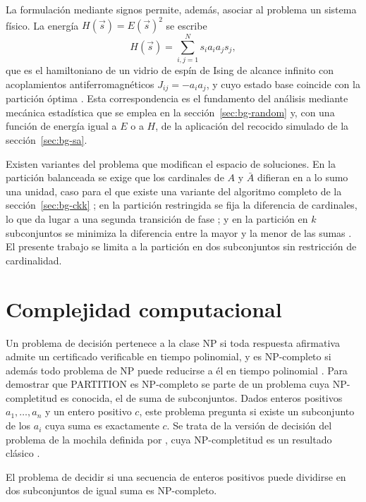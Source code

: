 La formulación mediante signos permite, además, asociar al problema un sistema físico. La energía $H(\vec{s}) = E(\vec{s})^2$ se escribe
\begin{equation}
    H(\vec{s}) = \sum_{i,j=1}^{N} s_i a_i a_j s_j,
    \label{eq:bg-hamiltonian}
\end{equation}
que es el hamiltoniano de un vidrio de espín de Ising de alcance infinito con acoplamientos antiferromagnéticos $J_{ij} = -a_i a_j$, y cuyo estado base coincide con la partición óptima \parencite{mertens1998,mertens2001,ferreira1998}. Esta correspondencia es el fundamento del análisis mediante mecánica estadística que se emplea en la sección~\ref{sec:bg-random} y, con una función de energía igual a $E$ o a $H$, de la aplicación del recocido simulado de la sección~\ref{sec:bg-sa}.

Existen variantes del problema que modifican el espacio de soluciones. En la partición balanceada se exige que los cardinales de $A$ y $\bar{A}$ difieran en a lo sumo una unidad, caso para el que existe una variante del algoritmo completo de la sección~\ref{sec:bg-ckk} \parencite{mertens1999}; en la partición restringida se fija la diferencia de cardinales, lo que da lugar a una segunda transición de fase \parencite{mertens2001}; y en la partición en $k$ subconjuntos se minimiza la diferencia entre la mayor y la menor de las sumas \parencite{korf1998,gent1996}. El presente trabajo se limita a la partición en dos subconjuntos sin restricción de cardinalidad.

\section{Complejidad computacional}

Un problema de decisión pertenece a la clase NP si toda respuesta afirmativa admite un certificado verificable en tiempo polinomial, y es NP-completo si además todo problema de NP puede reducirse a él en tiempo polinomial \parencite{cook1971,garey1979}. Para demostrar que PARTITION es NP-completo se parte de un problema cuya NP-completitud es conocida, el de suma de subconjuntos. Dados enteros positivos $a_1, \ldots, a_n$ y un entero positivo $c$, este problema pregunta si existe un subconjunto de los $a_i$ cuya suma es exactamente $c$. Se trata de la versión de decisión del problema de la mochila definida por \textcite{karp1972}, cuya NP-completitud es un resultado clásico \parencite{karp1972,garey1979,merkle1978}.

\begin{theorem}\label{thm:np-complete}
	El problema de decidir si una secuencia de enteros positivos puede dividirse en dos subconjuntos de igual suma es NP-completo.
\end{theorem}

